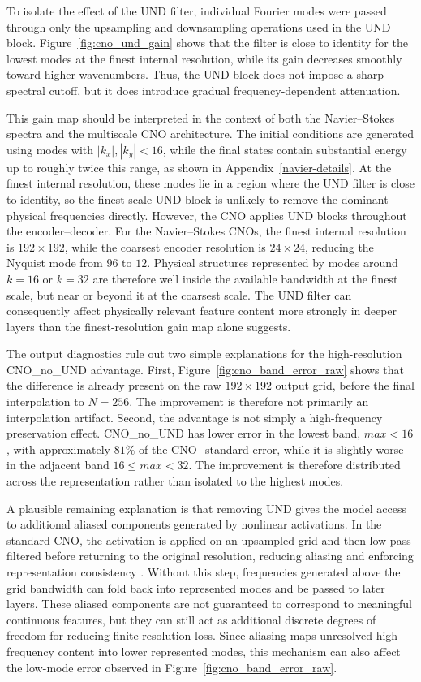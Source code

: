 To isolate the effect of the UND filter, individual Fourier modes were passed through only the upsampling and downsampling operations used in the UND block. Figure~\ref{fig:cno_und_gain} shows that the filter is close to identity for the lowest modes at the finest internal resolution, while its gain decreases smoothly toward higher wavenumbers. Thus, the UND block does not impose a sharp spectral cutoff, but it does introduce gradual frequency-dependent attenuation.

This gain map should be interpreted in the context of both the Navier--Stokes spectra and the multiscale CNO architecture. The initial conditions are generated using modes with \(|k_x|,|k_y|<16\), while the final states contain substantial energy up to roughly twice this range, as shown in Appendix~\ref{navier-details}. At the finest internal resolution, these modes lie in a region where the UND filter is close to identity, so the finest-scale UND block is unlikely to remove the dominant physical frequencies directly. However, the CNO applies UND blocks throughout the encoder--decoder. For the Navier--Stokes CNOs, the finest internal resolution is \(192\times192\), while the coarsest encoder resolution is \(24\times24\), reducing the Nyquist mode from \(96\) to \(12\). Physical structures represented by modes around \(k=16\) or \(k=32\) are therefore well inside the available bandwidth at the finest scale, but near or beyond it at the coarsest scale. The UND filter can consequently affect physically relevant feature content more strongly in deeper layers than the finest-resolution gain map alone suggests.

The output diagnostics rule out two simple explanations for the high-resolution CNO\_no\_UND advantage. First, Figure~\ref{fig:cno_band_error_raw} shows that the difference is already present on the raw \(192\times192\) output grid, before the final interpolation to \(N=256\). The improvement is therefore not primarily an interpolation artifact. Second, the advantage is not simply a high-frequency preservation effect. CNO\_no\_UND has lower error in the lowest band, \(max<16\), with approximately \(81\%\) of the CNO\_standard error, while it is slightly worse in the adjacent band \(16\leq max<32\). The improvement is therefore distributed across the representation rather than isolated to the highest modes.

A plausible remaining explanation is that removing UND gives the model access to additional aliased components generated by nonlinear activations. In the standard CNO, the activation is applied on an upsampled grid and then low-pass filtered before returning to the original resolution, reducing aliasing and enforcing representation consistency \cite{bartolucci-discretization-invariance}. Without this step, frequencies generated above the grid bandwidth can fold back into represented modes and be passed to later layers. These aliased components are not guaranteed to correspond to meaningful continuous features, but they can still act as additional discrete degrees of freedom for reducing finite-resolution loss. Since aliasing maps unresolved high-frequency content into lower represented modes, this mechanism can also affect the low-mode error observed in Figure~\ref{fig:cno_band_error_raw}.

